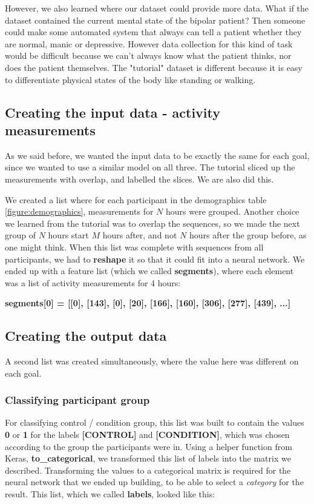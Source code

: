 However, we also learned where our dataset could provide more data. 
What if the dataset contained the current mental state of the bipolar patient? Then someone could make some automated system that always can tell a patient 
whether they are normal, manic or depressive. However data collection for this kind of task would be difficult because we can't always know what the
patient thinks, nor does the patient themselves. The "tutorial" dataset is different because it is easy to differentiate physical states of the body
like standing or walking.

\subsection{Creating the input data - activity measurements}

As we said before, we wanted the input data to be exactly the same for each goal, since we wanted to use a similar model on all three.
The tutorial \cite{1d_cnn} sliced up the measurements with overlap, and labelled the slices. We are also did this.

We created a list where for each participant in the demographics table \ref{figure:demographics}, measurements for $N$ hours were grouped. 
Another choice we learned from the tutorial was to overlap the sequences, so we made the next group of $N$ hours start \textit{$M$} hours after, 
and not \textit{$N$} hours after the group before, as one might think. When this list was complete with sequences from all participants, we 
had to \textbf{reshape} it so that it could fit into a neural network. We ended up with a feature list (which we called \textbf{segments}), 
where each element was a list of activity measurements for 4 hours: 

\textbf{segments[0] = [[0], [143], [0], [20], [166], [160], [306], [277], [439], ...]}

\subsection{Creating the output data}

A second list was created simultaneously, where the value here was different on each goal. 

\subsubsection{Classifying participant group}
For classifying control / condition group, this list was built to contain the values \textbf{0} or \textbf{1} for the labels
\textbf{[CONTROL]} and \textbf{[CONDITION]}, which was chosen according to the group the participants were in. Using a helper function from Keras, 
\textbf{to\_categorical}, we transformed this list of labels into the matrix we described. Transforming the values to a
categorical matrix is required for the neural network that we ended up building, to be able to select a \textit{category} for the result. 
This list, which we called \textbf{labels}, looked like this: 


